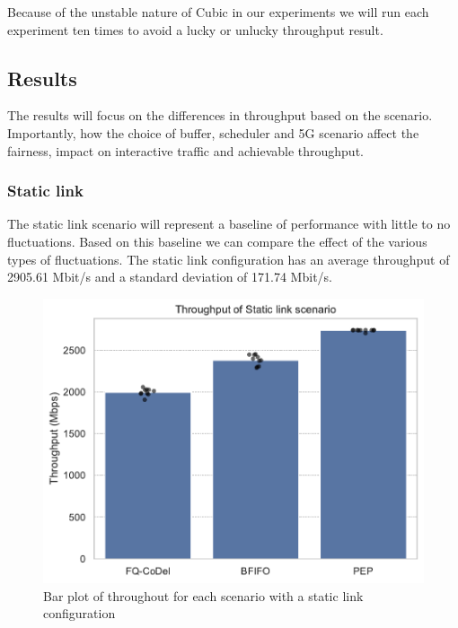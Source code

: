 \documentclass[a4paper,english, 12pt]{report}
\begin{document}
Because of the unstable nature of Cubic in our experiments we will run each experiment ten times to avoid a lucky or unlucky throughput result.



\subsection{Results}
The results will focus on the differences in throughput based on the scenario. Importantly, how the choice of buffer, scheduler and 5G scenario affect the fairness, impact on interactive traffic and achievable throughput. 

\subsubsection{Static link}
The static link scenario will represent a baseline of performance with little to no fluctuations. Based on this baseline we can compare the effect of the various types of fluctuations. The static link configuration has an average throughput of 2905.61 Mbit/s and a standard deviation of 171.74 Mbit/s.\\

\begin{figure}[!h!] %
	\centering
	\includegraphics[scale=0.70]{../diagrams/witestlab/throughput/throughput_sl.pdf}
  	\caption{Bar plot of throughout for each scenario with a static link configuration}
  	\label{fig:throughput_sl}
\end{figure}
\end{document}
